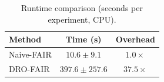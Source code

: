 \begin{table}[h]
\centering
\caption{Runtime comparison (seconds per experiment, CPU).}
\label{tab:runtime}
\begin{tabular}{lcc}
\toprule
Method & Time (s) & Overhead \\
\midrule
Naive-FAIR & $10.6 \pm 9.1$ & $1.0\times$ \\
DRO-FAIR & $397.6 \pm 257.6$ & $37.5\times$ \\
\bottomrule
\end{tabular}
\end{table}